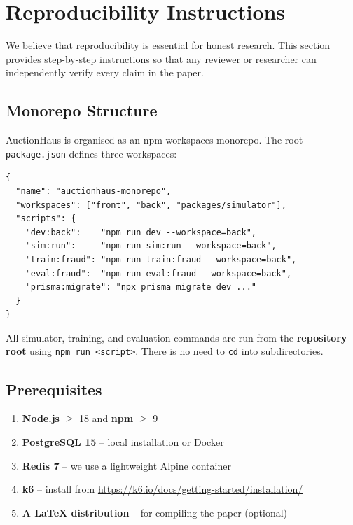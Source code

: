 \documentclass[11pt]{article}
\begin{document}
\section{Reproducibility Instructions}
\label{sec:repro}

We believe that reproducibility is essential for honest research. This
section provides step-by-step instructions so that any reviewer or
researcher can independently verify every claim in the paper.

\subsection{Monorepo Structure}

AuctionHaus is organised as an npm workspaces monorepo. The root
\texttt{package.json} defines three workspaces:

\begin{lstlisting}[language={},caption={Root package.json (abbreviated).}]
{
  "name": "auctionhaus-monorepo",
  "workspaces": ["front", "back", "packages/simulator"],
  "scripts": {
    "dev:back":    "npm run dev --workspace=back",
    "sim:run":     "npm run sim:run --workspace=back",
    "train:fraud": "npm run train:fraud --workspace=back",
    "eval:fraud":  "npm run eval:fraud --workspace=back",
    "prisma:migrate": "npx prisma migrate dev ..."
  }
}
\end{lstlisting}

All simulator, training, and evaluation commands are run from the
\textbf{repository root} using \texttt{npm run <script>}. There is no
need to \texttt{cd} into subdirectories.

\subsection{Prerequisites}

\begin{enumerate}
    \item \textbf{Node.js} $\geq$ 18 and \textbf{npm} $\geq$ 9
    \item \textbf{PostgreSQL 15} -- local installation or Docker
    \item \textbf{Redis 7} -- we use a lightweight Alpine container
    \item \textbf{k6} -- install from \url{https://k6.io/docs/getting-started/installation/}
    \item \textbf{A LaTeX distribution} -- for compiling the paper (optional)
\end{enumerate}
\end{document}
